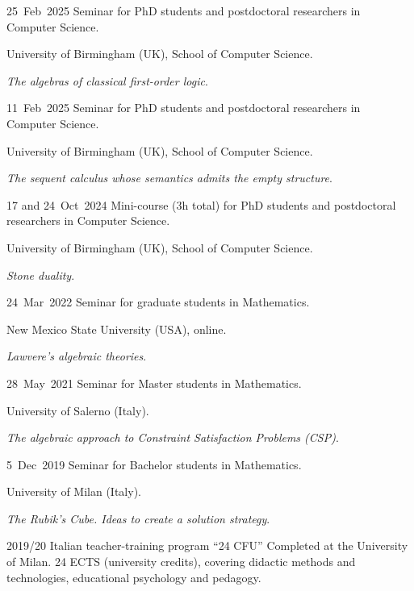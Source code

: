 
\chronorow
  {25~Feb~2025}
  {Seminar for PhD students and postdoctoral researchers in Computer Science.}
  {\textcolor{secondary}{University of Birmingham (UK), School of Computer Science.}\par
   \textit{The algebras of classical first-order logic}.}

\chronorow
  {11~Feb~2025}
  {Seminar for PhD students and postdoctoral researchers in Computer Science.}
  {\textcolor{secondary}{University of Birmingham (UK), School of Computer Science.}\par
   \textit{The sequent calculus whose semantics admits the empty structure}.}

\chronorow
  {17 and 24~Oct~2024}
  {Mini-course (3h total) for PhD students and postdoctoral researchers in Computer Science.}
  {\textcolor{secondary}{University of Birmingham (UK), School of Computer Science.}\par
   \textit{Stone duality}.}

\chronorow
  {24~Mar~2022}
  {Seminar for graduate students in Mathematics.}
  {\textcolor{secondary}{New Mexico State University (USA), online.}\par
   \textit{Lawvere's algebraic theories}.}

\chronorow
  {28~May~2021}
  {Seminar for Master students in Mathematics.}
  {\textcolor{secondary}{University of Salerno (Italy).}\par
   \textit{The algebraic approach to Constraint Satisfaction Problems (CSP)}.}

\chronorow
  {5~Dec~2019}
  {Seminar for Bachelor students in Mathematics.}
  {\textcolor{secondary}{University of Milan (Italy).}\par
   \textit{The Rubik's Cube. Ideas to create a solution strategy}.}


\chronorow
  {2019/20}
  {Italian teacher-training program ``24 CFU''}
  {Completed at the University of Milan. 24 ECTS (university credits), covering didactic methods and
   technologies, educational psychology and pedagogy.}
